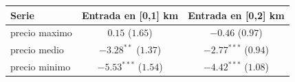 \begin{tabular}{lcc}
\toprule
Serie & Entrada en [0,1] km & Entrada en [0,2] km \\
\midrule
precio maximo & $0.15$ ($1.65$) & $-0.46$ ($0.97$) \\
precio medio & $-3.28^{**}$ ($1.37$) & $-2.77^{***}$ ($0.94$) \\
precio minimo & $-5.53^{***}$ ($1.54$) & $-4.42^{***}$ ($1.08$) \\
\bottomrule
\end{tabular}
